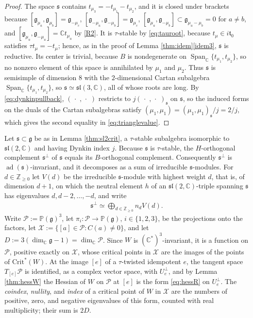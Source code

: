 \documentclass [leqno, 10pt]{amsart}
\theoremstyle{definition}
\numberwithin{equation}{section}
\newcommand{\dum}{\,\cdot\,\,}
\newcommand{\integer}{\mathbb{Z}}
\newcommand{\spn}{\operatorname{Span}}
\newcommand{\sll}{\mathfrak{sl}}
\newcommand{\proj}{\mathbb{P}}
\newcommand{\g}{\mathfrak{g}}
\newcommand{\ad}{\operatorname{ad}}
\newcommand{\com}{\mathbb C}
\newcommand{\crtnt}{\mathrm{Crit}^*}
\newcommand{\subs}{\mathfrak{s}}
\newcommand{\Usp}{U}
\newcommand{\Uperp}{\Usp^{\perp}}
\begin{document}
\begin{proof}
The space $\subs$ contains $t_{\mu_{3}} = -t_{\mu_{1}} - t_{\mu_{2}}$, and it is closed under brackets because $[\g_{\mu_{a}}, \g_{\mu_{b}}] = \g_{-\mu_{c}}$, $[\g_{-\mu_{a}}, \g_{-\mu_{b}}] = \g_{\mu_{c}}$, $[\g_{\mu_{a}}, \g_{-\mu_{b}}] \subset \g_{\mu_{a} - \mu_{b}} = 0$ for $a \neq b$, and $[\g_{\mu_{a}}, \g_{-\mu_{a}}] = \com t_{\mu_{a}}$ by \ref{R2}. It is $\tau$-stable by \eqref{eq:tauroot}, because $t_{\mu} \in i\mathfrak{t}_{0}$ satisfies $\tau t_{\mu} = -t_{\mu}$; hence, as in the proof of Lemma \ref{thm:idem}\ref{idem3}, $\subs$ is reductive. Its center is trivial, because $B$ is nondegenerate on $\spn_{\com}\{t_{\mu_{1}}, t_{\mu_{2}}\}$, so no nonzero element of this space is annihilated by $\mu_{1}$ and $\mu_{2}$. Thus $\subs$ is semisimple of dimension $8$ with the $2$-dimensional Cartan subalgebra $\spn_{\com}\{t_{\mu_{1}}, t_{\mu_{2}}\}$, so $\subs \simeq \sll(3, \com)$, all of whose roots are long. By \eqref{eq:dynkinpullback}, $(\dum, \dum)$ restricts to $j(\dum, \dum)_{\subs}$ on $\subs$, so the induced forms on the duals of the Cartan subalgebras satisfy $(\mu_{1}, \mu_{1}) = (\mu_{1}, \mu_{1})_{\subs}/j = 2/j$, which gives the second equality in \eqref{eq:trianglevalue}.
\end{proof}

Let $\subs\subset \g$ be as in Lemma \ref{thm:sl2crit}, a $\tau$-stable subalgebra isomorphic to $\sll(2, \com)$ and having Dynkin index $j$. Because $\subs$ is $\tau$-stable, the $H$-orthogonal complement $\subs^{\perp}$ of $\subs$ equals its $B$-orthogonal complement. Consequently $\subs^{\perp}$ is $\ad(\subs)$-invariant, and it decomposes as a sum of irreducible $\subs$-modules. For $d \in \integer_{\geq 0}$ let $V(d)$ be the irreducible $\subs$-module with highest weight $d$, that is, of dimension $d+1$, on which the neutral element $h$ of an $\sll(2, \com)$-triple spanning $\subs$ has eigenvalues $d, d-2, \dots, -d$, and write
\begin{align}\label{eq:sperpdecomp}
\subs^{\perp} \simeq \bigoplus_{d \in \integer_{\geq 0}}n_{d}V(d).
\end{align}
Write $\mathcal{P} := \proj(\g)^{3}$, let $\pi_{i}:\mathcal{P} \to \proj(\g)$, $i \in \{1, 2, 3\}$, be the projections onto the factors, let $\mathcal{X} := \{[a] \in \mathcal{P}: C(a) \neq 0\}$, and let $D := 3(\dim_{\com}\g - 1) = \dim_{\com}\mathcal{P}$. Since $W$ is $(\com^{\ast})^{3}$-invariant, it is a function on $\mathcal{P}$, positive exactly on $\mathcal{X}$, whose critical points in $\mathcal{X}$ are the images of the points of $\crtnt(W)$. At the image $[e]$ of a $\tau$-twisted idempotent $e$, the tangent space $T_{[e]}\mathcal{P}$ is identified, as a complex vector space, with $\Uperp_{e}$, and by Lemma \ref{thm:hessW} the Hessian of $W$ on $\mathcal{P}$ at $[e]$ is the form \eqref{eq:hessR} on $\Uperp_{e}$. The \emph{coindex}, \emph{nullity}, and \emph{index} of a critical point of $W$ in $\mathcal{X}$ are the numbers of positive, zero, and negative eigenvalues of this form, counted with real multiplicity; their sum is $2D$.
\end{document}

